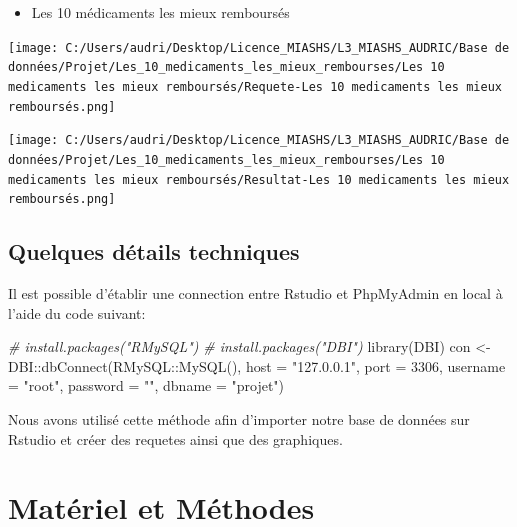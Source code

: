 \documentclass[mstat,12pt]{unswthesis}
\newenvironment{Shaded}{\begin{snugshade}}{\end{snugshade}}
\newcommand{\AttributeTok}[1]{\textcolor[rgb]{0.77,0.63,0.00}{#1}}
\newcommand{\CommentTok}[1]{\textcolor[rgb]{0.56,0.35,0.01}{\textit{#1}}}
\newcommand{\DecValTok}[1]{\textcolor[rgb]{0.00,0.00,0.81}{#1}}
\newcommand{\FunctionTok}[1]{\textcolor[rgb]{0.00,0.00,0.00}{#1}}
\newcommand{\NormalTok}[1]{#1}
\newcommand{\OtherTok}[1]{\textcolor[rgb]{0.56,0.35,0.01}{#1}}
\newcommand{\SpecialCharTok}[1]{\textcolor[rgb]{0.00,0.00,0.00}{#1}}
\newcommand{\StringTok}[1]{\textcolor[rgb]{0.31,0.60,0.02}{#1}}
\begin{document}
\begin{itemize}
\tightlist
\item
  Les 10 médicaments les mieux remboursés \bigskip
\end{itemize}

\texttt{[image: C:/Users/audri/Desktop/Licence\_MIASHS/L3\_MIASHS\_AUDRIC/Base de données/Projet/Les\_10\_medicaments\_les\_mieux\_rembourses/Les 10 medicaments les mieux remboursés/Requete-Les 10 medicaments les mieux remboursés.png]}
\bigskip

\texttt{[image: C:/Users/audri/Desktop/Licence\_MIASHS/L3\_MIASHS\_AUDRIC/Base de données/Projet/Les\_10\_medicaments\_les\_mieux\_rembourses/Les 10 medicaments les mieux remboursés/Resultat-Les 10 medicaments les mieux remboursés.png]}

\bigskip

\hypertarget{quelques-duxe9tails-techniques-1}{%
\section{Quelques détails
techniques}\label{quelques-duxe9tails-techniques-1}}

Il est possible d'établir une connection entre Rstudio et PhpMyAdmin en
local à l'aide du code suivant:

\scriptsize

\begin{Shaded}
\begin{Highlighting}[]
\CommentTok{\# install.packages("RMySQL")}
\CommentTok{\# install.packages("DBI")}
\FunctionTok{library}\NormalTok{(DBI)}
\NormalTok{con }\OtherTok{\textless{}{-}}\NormalTok{ DBI}\SpecialCharTok{::}\FunctionTok{dbConnect}\NormalTok{(RMySQL}\SpecialCharTok{::}\FunctionTok{MySQL}\NormalTok{(),}
\AttributeTok{host =} \StringTok{"127.0.0.1"}\NormalTok{,}
\AttributeTok{port =} \DecValTok{3306}\NormalTok{,}
\AttributeTok{username =} \StringTok{"root"}\NormalTok{,}
\AttributeTok{password =} \StringTok{""}\NormalTok{,}
\AttributeTok{dbname =} \StringTok{"projet"}\NormalTok{)}
\end{Highlighting}
\end{Shaded}

\bigskip
\bigskip
\bigskip

Nous avons utilisé cette méthode afin d'importer notre base de données
sur Rstudio et créer des requetes ainsi que des graphiques.

\hypertarget{matuxe9riel-et-muxe9thodes}{%
\chapter{Matériel et Méthodes}\label{matuxe9riel-et-muxe9thodes}}
\end{document}
